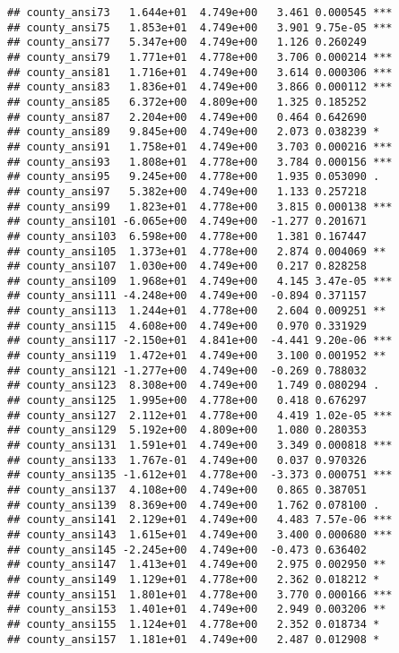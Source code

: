 \documentclass[
]{book}
\begin{document}
\begin{verbatim}
## county_ansi73   1.644e+01  4.749e+00   3.461 0.000545 ***
## county_ansi75   1.853e+01  4.749e+00   3.901 9.75e-05 ***
## county_ansi77   5.347e+00  4.749e+00   1.126 0.260249    
## county_ansi79   1.771e+01  4.778e+00   3.706 0.000214 ***
## county_ansi81   1.716e+01  4.749e+00   3.614 0.000306 ***
## county_ansi83   1.836e+01  4.749e+00   3.866 0.000112 ***
## county_ansi85   6.372e+00  4.809e+00   1.325 0.185252    
## county_ansi87   2.204e+00  4.749e+00   0.464 0.642690    
## county_ansi89   9.845e+00  4.749e+00   2.073 0.038239 *  
## county_ansi91   1.758e+01  4.749e+00   3.703 0.000216 ***
## county_ansi93   1.808e+01  4.778e+00   3.784 0.000156 ***
## county_ansi95   9.245e+00  4.778e+00   1.935 0.053090 .  
## county_ansi97   5.382e+00  4.749e+00   1.133 0.257218    
## county_ansi99   1.823e+01  4.778e+00   3.815 0.000138 ***
## county_ansi101 -6.065e+00  4.749e+00  -1.277 0.201671    
## county_ansi103  6.598e+00  4.778e+00   1.381 0.167447    
## county_ansi105  1.373e+01  4.778e+00   2.874 0.004069 ** 
## county_ansi107  1.030e+00  4.749e+00   0.217 0.828258    
## county_ansi109  1.968e+01  4.749e+00   4.145 3.47e-05 ***
## county_ansi111 -4.248e+00  4.749e+00  -0.894 0.371157    
## county_ansi113  1.244e+01  4.778e+00   2.604 0.009251 ** 
## county_ansi115  4.608e+00  4.749e+00   0.970 0.331929    
## county_ansi117 -2.150e+01  4.841e+00  -4.441 9.20e-06 ***
## county_ansi119  1.472e+01  4.749e+00   3.100 0.001952 ** 
## county_ansi121 -1.277e+00  4.749e+00  -0.269 0.788032    
## county_ansi123  8.308e+00  4.749e+00   1.749 0.080294 .  
## county_ansi125  1.995e+00  4.778e+00   0.418 0.676297    
## county_ansi127  2.112e+01  4.778e+00   4.419 1.02e-05 ***
## county_ansi129  5.192e+00  4.809e+00   1.080 0.280353    
## county_ansi131  1.591e+01  4.749e+00   3.349 0.000818 ***
## county_ansi133  1.767e-01  4.749e+00   0.037 0.970326    
## county_ansi135 -1.612e+01  4.778e+00  -3.373 0.000751 ***
## county_ansi137  4.108e+00  4.749e+00   0.865 0.387051    
## county_ansi139  8.369e+00  4.749e+00   1.762 0.078100 .  
## county_ansi141  2.129e+01  4.749e+00   4.483 7.57e-06 ***
## county_ansi143  1.615e+01  4.749e+00   3.400 0.000680 ***
## county_ansi145 -2.245e+00  4.749e+00  -0.473 0.636402    
## county_ansi147  1.413e+01  4.749e+00   2.975 0.002950 ** 
## county_ansi149  1.129e+01  4.778e+00   2.362 0.018212 *  
## county_ansi151  1.801e+01  4.778e+00   3.770 0.000166 ***
## county_ansi153  1.401e+01  4.749e+00   2.949 0.003206 ** 
## county_ansi155  1.124e+01  4.778e+00   2.352 0.018734 *  
## county_ansi157  1.181e+01  4.749e+00   2.487 0.012908 *  

\end{verbatim}
\end{document}
